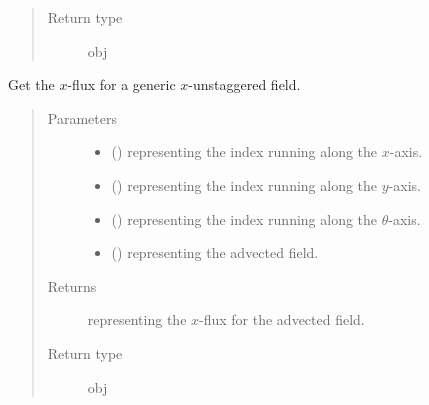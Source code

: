 \documentclass[letterpaper,10pt,english]{sphinxmanual}
\begin{document}
\begin{fulllineitems}
\begin{fulllineitems}
\begin{quote}
\begin{description}
\item[{Return type}] \leavevmode
obj

\end{description}\end{quote}

\end{fulllineitems}


\begin{fulllineitems}
\label{\detokenize{api:tasmania.dycore.flux_isentropic_nonconservative_centered.FluxIsentropicNonconservativeCentered._get_centered_flux_x_unstg}}
Get the \(x\)-flux for a generic \(x\)-unstaggered field.
\begin{quote}\begin{description}
\item[{Parameters}] \leavevmode\begin{itemize}
\item {} 
 () \textendash{}  representing the index running along the \(x\)-axis.

\item {} 
 () \textendash{}  representing the index running along the \(y\)-axis.

\item {} 
 () \textendash{}  representing the index running along the \(\theta\)-axis.

\item {} 
 () \textendash{}  representing the advected field.

\end{itemize}

\item[{Returns}] \leavevmode
{} representing the \(x\)-flux for the advected field.

\item[{Return type}] \leavevmode
obj


\end{description}
\end{quote}
\end{fulllineitems}
\end{fulllineitems}
\end{document}
